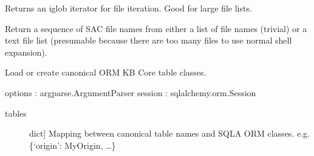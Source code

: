 \documentclass[letterpaper,10pt,english]{sphinxmanual}
\begin{document}

\begin{fulllineitems}
\label{\detokenize{infrapy.utils:infrapy.utils.ms2db.dicts2rows}}
\end{fulllineitems}


\begin{fulllineitems}
\label{\detokenize{infrapy.utils:infrapy.utils.ms2db.expand_glob}}
Returns an iglob iterator for file iteration. Good for large file lists.

\end{fulllineitems}


\begin{fulllineitems}
\label{\detokenize{infrapy.utils:infrapy.utils.ms2db.get_files}}
Return a sequence of SAC file names from either a list of file names
(trivial) or a text file list (presumable because there are too many files
to use normal shell expansion).

\end{fulllineitems}


\begin{fulllineitems}
\label{\detokenize{infrapy.utils:infrapy.utils.ms2db.get_or_create_tables}}
Load or create canonical ORM KB Core table classes.

options : argparse.ArgumentParser
session : sqlalchemy.orm.Session
\begin{description}
\item[{tables}] \leavevmode{[}dict{]}
Mapping between canonical table names and SQLA ORM classes.
e.g. \{‘origin’: MyOrigin, …\}

\end{description}

\end{fulllineitems}
\end{document}
